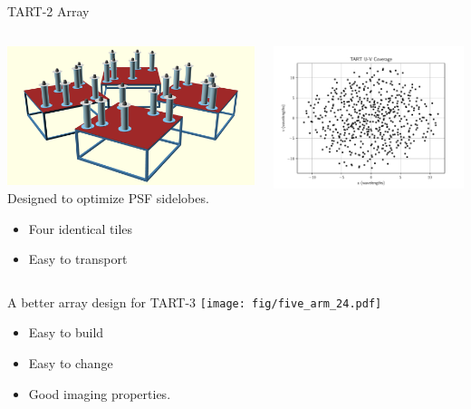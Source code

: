 \documentclass[ignorenonframetext]{beamer}
\begin{document}
\begin{frame}{TART-2 Array}
 \begin{columns}[T]
  \begin{column}{0.5\linewidth}
   \includegraphics[width=\linewidth]{fig/tart2_array.png}
  Designed to optimize PSF sidelobes.
  \begin{itemize}
   \item Four identical tiles
   \item Easy to transport
  \end{itemize}
  \end{column}
  \begin{column}{0.5\linewidth}
  \includegraphics[width=\linewidth]{fig/TART_UV.pdf}
  \end{column}
 \end{columns}
\end{frame}

\begin{frame}{A better array design for TART-3}
 \texttt{[image: fig/five\_arm\_24.pdf]}
 \begin{itemize}
  \item Easy to build
  \item Easy to change
  \item Good imaging properties.
 \end{itemize}

\end{frame}
\end{document}
